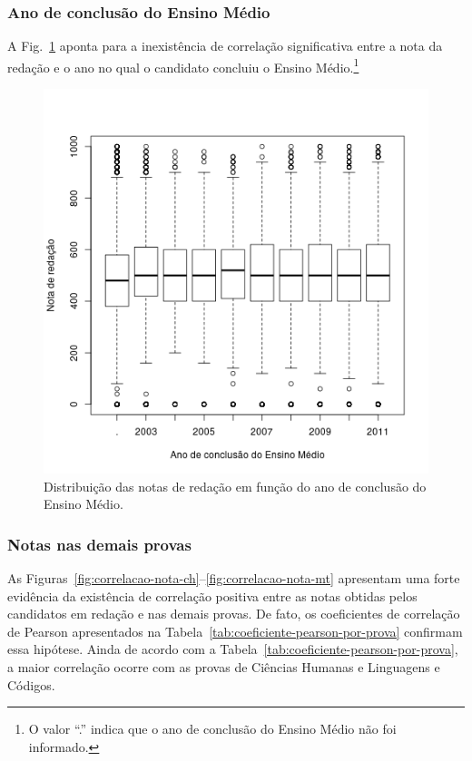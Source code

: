 \documentclass[12pt]{article}
\newcommand{\reffig}[1]{Fig.~\ref{fig:#1}}
\newcommand{\reftab}[1]{Tabela~\ref{tab:#1}}
\begin{document}
\subsubsection{Ano de conclusão do Ensino Médio}
A \reffig{correlacao-ano-concluiu} aponta para a inexistência de correlação significativa entre a nota da redação e o ano no qual o candidato concluiu o Ensino Médio.\footnote{O valor ``.'' indica que o ano de conclusão do Ensino Médio não foi informado.}
\begin{figure}[H]
\centering\includegraphics[width=.44\linewidth]{../correlacao_ano_concluiu.png}
\caption{Distribuição das notas de redação em função do ano de conclusão do Ensino Médio.}
\label{fig:correlacao-ano-concluiu}
\end{figure}

\subsubsection{Notas nas demais provas}
As Figuras~\ref{fig:correlacao-nota-ch}--\ref{fig:correlacao-nota-mt} apresentam uma forte evidência da existência de correlação positiva entre as notas obtidas pelos candidatos em redação e nas demais provas.
De fato, os coeficientes de correlação de Pearson apresentados na \reftab{coeficiente-pearson-por-prova} confirmam essa hipótese.
Ainda de acordo com a \reftab{coeficiente-pearson-por-prova}, a maior correlação ocorre com as provas de Ciências Humanas e Linguagens e Códigos.
\end{document}
